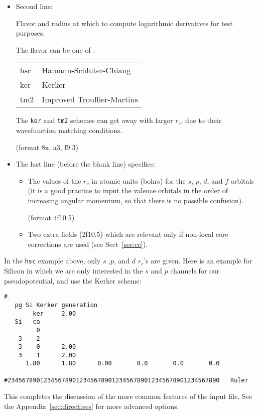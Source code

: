 \documentclass[11pt]{article}
\begin{document}
\begin{itemize}
\item Second line: 

Flavor and radius at which to compute logarithmic
derivatives for test purposes. 

The flavor can be one of :
\begin{tabular}{ll}
	hsc	&Hamann-Schluter-Chiang\\
	ker	&Kerker\\
	tm2	&Improved Troullier-Martins\\
\end{tabular}

The {\tt ker} and {\tt tm2} schemes can get away with larger $r_c$,
due to their wavefunction matching conditions.

(format 8x, a3, f9.3)

\item The last line (before the blank line) specifies:

\begin{itemize}
\item The values of the $r_c$ in atomic units (bohrs) for the $s$,
$p$, $d$, and $f$ orbitals (it is a good practice to input the valence
orbitals in the order of increasing angular momentum, so that there is
no possible confusion).

(format 4f10.5)  

\item Two extra fields (2f10.5) which are relevant only if non-local
core corrections are used (see Sect~\ref{sec:cc}).
\end{itemize}
\end{itemize}

In the {\tt hsc} example above, only $s$ ,$p$, and $d$ $r_c$'s are
given. Here is an example for Silicon in which we are only interested
in the $s$ and $p$ channels for our pseudopotential, and use the Kerker
scheme:

\begin{verbatim}
# 
   pg Si Kerker generation
        ker     2.00
   Si   ca
         0
    3    2
    3    0      2.00
    3    1      2.00
      1.80      1.80      0.00       0.0       0.0       0.0

#23456789012345678901234567890123456789012345678901234567890   Ruler
\end{verbatim}


This completes the discussion of the more common features of the input
file. See the Appendix~\ref{sec:directives} for more advanced options.
\end{document}
